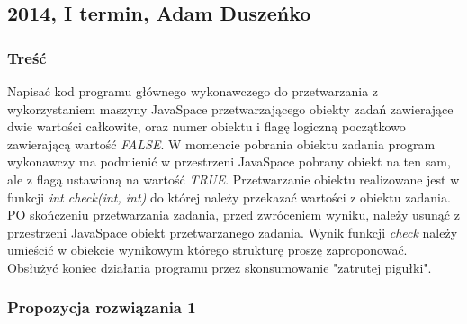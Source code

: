 	\subsection{2014, I termin, Adam Duszeńko}
		\subsubsection{Treść}
			Napisać kod programu głównego wykonawczego do przetwarzania z wykorzystaniem maszyny JavaSpace przetwarzającego obiekty zadań zawierające dwie wartości całkowite, oraz numer obiektu i flagę logiczną początkowo zawierającą wartość \textit{FALSE}. W momencie pobrania obiektu zadania program wykonawczy ma podmienić w przestrzeni JavaSpace pobrany obiekt na ten sam, ale z flagą ustawioną na wartość \textit{TRUE}. Przetwarzanie obiektu realizowane jest w funkcji \textit{int check(int, int)} do której należy przekazać wartości z obiektu zadania. PO skończeniu przetwarzania zadania, przed zwróceniem wyniku, należy usunąć z przestrzeni JavaSpace obiekt przetwarzanego zadania. Wynik funkcji \textit{check} należy umieścić w obiekcie wynikowym którego strukturę proszę zaproponować. Obsłużyć koniec działania programu przez skonsumowanie "zatrutej pigułki".
		\subsubsection{Propozycja rozwiązania 1}
	
	
	
	
	
	
	
	
	
	
	
	
	
	
	
	
	
	
	